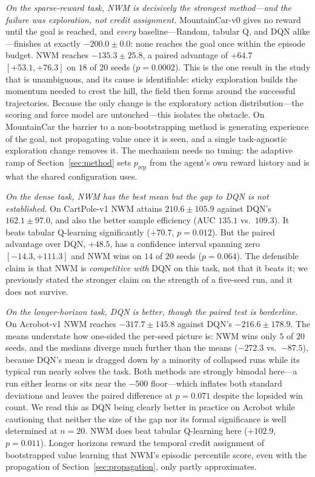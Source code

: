 \documentclass[11pt]{article}
\newcommand{\NWM}{\textsc{NWM}}
\begin{document}
\emph{On the sparse-reward task, \NWM{} is decisively the strongest method---and
the failure was exploration, not credit assignment.} MountainCar-v0 gives no
reward until the goal is reached, and \emph{every} baseline---Random, tabular Q,
and DQN alike---finishes at exactly $-200.0\pm0.0$: none reaches the goal once
within the episode budget. \NWM{} reaches $-135.3\pm25.8$, a paired advantage of
$+64.7$ $[+53.1,+76.3]$ on $18$ of $20$ seeds ($p=0.0002$). This is the one
result in the study that is unambiguous, and its cause is identifiable: sticky
exploration builds the momentum needed to crest the hill, the field then forms
around the successful trajectories. Because the only change is the exploratory
action distribution---the scoring and force model are untouched---this isolates
the obstacle. On MountainCar the barrier to a non-bootstrapping method is
generating experience of the goal, not propagating value once it is seen, and a
single task-agnostic exploration change removes it. The mechanism needs no
tuning: the adaptive ramp of Section~\ref{sec:method} sets $p_{\text{rep}}$ from
the agent's own reward history and is what the shared configuration uses.

\emph{On the dense task, \NWM{} has the best mean but the gap to DQN is not
established.} On CartPole-v1 \NWM{} attains $210.6\pm105.9$ against DQN's
$162.1\pm97.0$, and also the better sample efficiency (AUC $135.1$ vs.\
$109.3$). It beats tabular Q-learning significantly ($+70.7$, $p=0.012$). But
the paired advantage over DQN, $+48.5$, has a confidence interval spanning zero
$[-14.3,+111.3]$ and \NWM{} wins on $14$ of $20$ seeds ($p=0.064$). The
defensible claim is that \NWM{} is \emph{competitive with} DQN on this task, not
that it beats it; we previously stated the stronger claim on the strength of a
five-seed run, and it does not survive.

\emph{On the longer-horizon task, DQN is better, though the paired test is
borderline.} On Acrobot-v1 \NWM{} reaches $-317.7\pm145.8$ against DQN's
$-216.6\pm178.9$. The means understate how one-sided the per-seed picture is:
\NWM{} wins only $5$ of $20$ seeds, and the medians diverge much further than
the means ($-272.3$ vs.\ $-87.5$), because DQN's mean is dragged down by a
minority of collapsed runs while its typical run nearly solves the task. Both
methods are strongly bimodal here---a run either learns or sits near the $-500$
floor---which inflates both standard deviations and leaves the paired difference
at $p=0.071$ despite the lopsided win count. We read this as DQN being clearly
better in practice on Acrobot while cautioning that neither the size of the gap
nor its formal significance is well determined at $n{=}20$. \NWM{} does beat
tabular Q-learning here ($+102.9$, $p=0.011$). Longer horizons reward the
temporal credit assignment of bootstrapped value learning that \NWM{}'s episodic
percentile score, even with the propagation of Section~\ref{sec:propagation},
only partly approximates.
\end{document}

